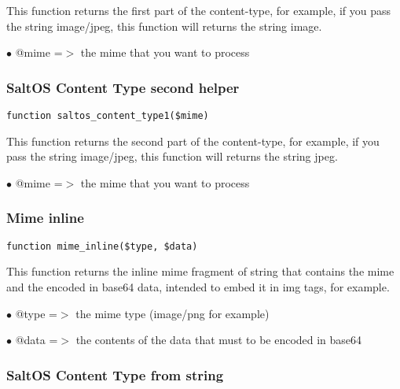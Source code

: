 \documentclass[a4paper]{article}
\begin{document}
This function returns the first part of the content-type, for example, if you
pass the string image/jpeg, this function will returns the string image.

\begin{compactitem}
\item[\color{myblue}$\bullet$] @mime =$>$ the mime that you want to process
\end{compactitem}

\hypertarget{toc178}{}
\subsubsection{SaltOS Content Type second helper}

\begin{lstlisting}
function saltos_content_type1($mime)
\end{lstlisting}

This function returns the second part of the content-type, for example, if you
pass the string image/jpeg, this function will returns the string jpeg.

\begin{compactitem}
\item[\color{myblue}$\bullet$] @mime =$>$ the mime that you want to process
\end{compactitem}

\hypertarget{toc179}{}
\subsubsection{Mime inline}

\begin{lstlisting}
function mime_inline($type, $data)
\end{lstlisting}

This function returns the inline mime fragment of string that contains the mime
and the encoded in base64 data, intended to embed it in img tags, for example.

\begin{compactitem}
\item[\color{myblue}$\bullet$] @type =$>$ the mime type (image/png for example)
\item[\color{myblue}$\bullet$] @data =$>$ the contents of the data that must to be encoded in base64
\end{compactitem}

\hypertarget{toc180}{}
\subsubsection{SaltOS Content Type from string}
\end{document}
